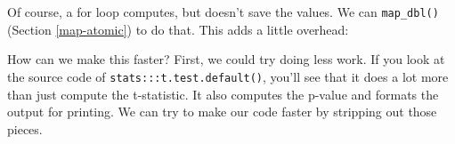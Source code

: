 \documentclass[]{book}
\newenvironment{Shaded}{\begin{snugshade}}{\end{snugshade}}
\newcommand{\CommentTok}[1]{\textcolor[rgb]{0.37,0.37,0.37}{\textit{#1}}}
\newcommand{\ControlFlowTok}[1]{\textcolor[rgb]{0.27,0.27,0.27}{\textbf{#1}}}
\newcommand{\DecValTok}[1]{\textcolor[rgb]{0.06,0.06,0.06}{#1}}
\newcommand{\KeywordTok}[1]{\textcolor[rgb]{0.27,0.27,0.27}{\textbf{#1}}}
\newcommand{\NormalTok}[1]{#1}
\newcommand{\OperatorTok}[1]{\textcolor[rgb]{0.43,0.43,0.43}{\textbf{#1}}}
\newcommand{\StringTok}[1]{\textcolor[rgb]{0.5,0.5,0.5}{#1}}
\begin{document}
Of course, a for loop computes, but doesn't save the values. We can \texttt{map\_dbl()} (Section \ref{map-atomic}) to do that. This adds a little overhead:

\begin{Shaded}
\end{Shaded}

How can we make this faster? First, we could try doing less work. If you look at the source code of \texttt{stats:::t.test.default()}, you'll see that it does a lot more than just compute the t-statistic. It also computes the p-value and formats the output for printing. We can try to make our code faster by stripping out those pieces.
\end{document}
